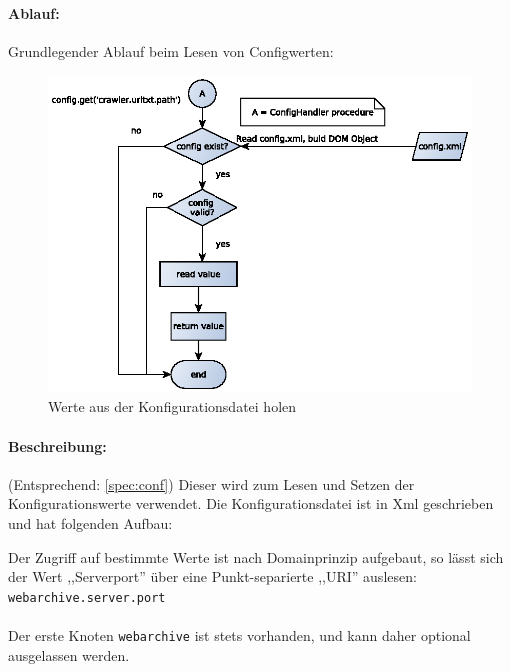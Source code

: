 \paragraph{Ablauf:}
\label{par:ablauf_}
Grundlegender Ablauf beim Lesen von Configwerten:
\begin{figure}[h!]
	\centering
	\label{dia:design:backend:overview}
	\includegraphics[width=\textwidth]{design/backend/gfx/getting_value.eps}
	\caption{Werte aus der Konfigurationsdatei holen}
\end{figure}

\paragraph{Beschreibung:}
(Entsprechend: \ref{spec:conf})
\label{par:beschreibung_}
Dieser wird zum Lesen und Setzen der Konfigurationswerte verwendet. Die Konfigurationsdatei ist in 
Xml geschrieben und hat folgenden Aufbau:
    
Der Zugriff auf bestimmte Werte ist nach Domainprinzip aufgebaut, so
lässt sich der Wert ,,Serverport'' über eine Punkt-separierte ,,URI'' auslesen: \texttt{webarchive.server.port} 
\\ \\
Der erste Knoten \texttt{webarchive} ist stets vorhanden, und kann daher optional ausgelassen werden.

